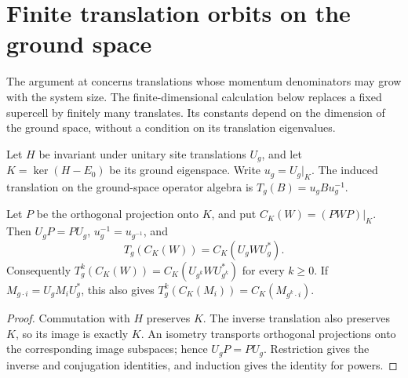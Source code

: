 \section{Finite translation orbits on the ground space}
\label{sec:hastings_finite_translation_orbit}

The argument at\cite[lines 1644--1654]{Hastings2006Solving} concerns
translations whose momentum denominators may grow with the system size.
The finite-dimensional calculation below replaces a fixed supercell by
finitely many translates. Its constants depend on the dimension of the
ground space, without a condition on its translation eigenvalues.

\begin{definition}
    \label{def:hastings_ground_translation}
    \leanok
    Let $H$ be invariant under unitary site translations $U_g$, and let
    $K=\ker(H-E_0)$ be its ground eigenspace. Write $u_g=U_g|_K$.
    The induced translation on the ground-space operator algebra is
    $T_g(B)=u_gBu_g^{-1}$.
\end{definition}

\begin{lemma}
    \label{lem:hastings_ground_translation_compression}
    \leanok
    Let $P$ be the orthogonal projection onto $K$, and put
    $C_K(W)=(PWP)|_K$. Then $U_gP=PU_g$, $u_g^{-1}=u_{g^{-1}}$, and
    \[
        T_g(C_K(W))=C_K(U_gWU_g^*).
    \]
    Consequently $T_g^k(C_K(W))=C_K(U_{g^k}WU_{g^k}^*)$ for every $k\ge0$.
    If $M_{g\cdot i}=U_gM_iU_g^*$, this also gives
    $T_g^k(C_K(M_i))=C_K(M_{g^k\cdot i})$.
\end{lemma}
\begin{proof}\leanok
    Commutation with $H$ preserves $K$. The inverse translation also
    preserves $K$, so its image is exactly $K$. An isometry transports
    orthogonal projections onto the corresponding image subspaces;
    hence $U_gP=PU_g$. Restriction gives the inverse and conjugation
    identities, and induction gives the identity for powers.
\end{proof}

